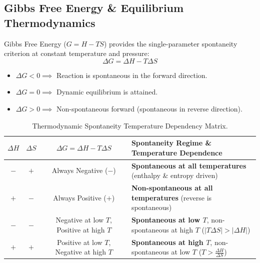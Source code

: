 \documentclass[10pt,a4paper]{article}
\begin{document}
\subsection{Gibbs Free Energy \& Equilibrium Thermodynamics}
Gibbs Free Energy ($G = H - TS$) provides the single-parameter spontaneity criterion at constant temperature and pressure:
\begin{equation}
  \Delta G = \Delta H - T \Delta S
\end{equation}
\begin{itemize}
  \item $\Delta G < 0 \implies$ Reaction is spontaneous in the forward direction.
  \item $\Delta G = 0 \implies$ Dynamic equilibrium is attained.
  \item $\Delta G > 0 \implies$ Non-spontaneous forward (spontaneous in reverse direction).
\end{itemize}

\begin{table}[htbp]
\centering
\small
\renewcommand{\arraystretch}{1.3}
\begin{tabularx}{\textwidth}{c c c L}
\toprule
$\Delta H$ & $\Delta S$ & $\Delta G = \Delta H - T\Delta S$ & \textbf{Spontaneity Regime \& Temperature Dependence} \\
\midrule
$-$ & $+$ & Always Negative ($-$) & \textbf{Spontaneous at all temperatures} (enthalpy \& entropy driven) \\
$+$ & $-$ & Always Positive ($+$) & \textbf{Non-spontaneous at all temperatures} (reverse is spontaneous) \\
$-$ & $-$ & Negative at low $T$, Positive at high $T$ & \textbf{Spontaneous at low $T$}, non-spontaneous at high $T$ ($|T\Delta S| > |\Delta H|$) \\
$+$ & $+$ & Positive at low $T$, Negative at high $T$ & \textbf{Spontaneous at high $T$}, non-spontaneous at low $T$ ($T > \frac{\Delta H}{\Delta S}$) \\
\bottomrule
\end{tabularx}
\caption{Thermodynamic Spontaneity Temperature Dependency Matrix.}
\end{table}
\end{document}
